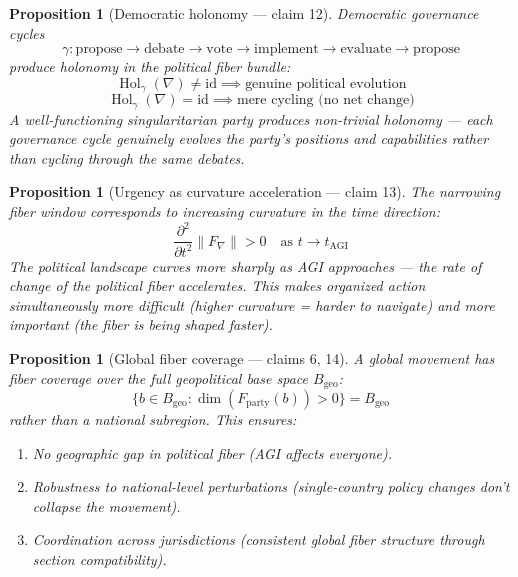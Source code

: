 \documentclass[11pt,a4paper]{article}
\newtheorem{proposition}[definition]{Proposition}
\begin{document}
\begin{proposition}[Democratic holonomy --- claim 12]
\label{prop:holonomy}
Democratic governance cycles
\[
  \gamma: \text{propose} \to \text{debate} \to \text{vote}
    \to \text{implement} \to \text{evaluate} \to \text{propose}
\]
produce holonomy in the political fiber bundle:
\[
  \operatorname{Hol}_\gamma(\nabla) \neq \mathrm{id}
  \implies \text{genuine political evolution}
\]
\[
  \operatorname{Hol}_\gamma(\nabla) = \mathrm{id}
  \implies \text{mere cycling (no net change)}
\]
A well-functioning singularitarian party produces non-trivial holonomy ---
each governance cycle genuinely evolves the party's positions and
capabilities rather than cycling through the same debates.
\end{proposition}

\begin{proposition}[Urgency as curvature acceleration --- claim 13]
\label{prop:urgency}
The narrowing fiber window corresponds to increasing curvature in the
time direction:
\[
  \frac{\partial^2}{\partial t^2} \|F_\nabla\| > 0
  \quad \text{as } t \to t_{\text{AGI}}
\]
The political landscape curves more sharply as AGI approaches --- the
rate of change of the political fiber accelerates. This makes organized
action simultaneously more difficult (higher curvature = harder to
navigate) and more important (the fiber is being shaped faster).
\end{proposition}

\begin{proposition}[Global fiber coverage --- claims 6, 14]
\label{prop:global}
A global movement has fiber coverage over the full geopolitical base
space $B_{\text{geo}}$:
\[
  \{b \in B_{\text{geo}} : \dim(F_{\text{party}}(b)) > 0\}
  = B_{\text{geo}}
\]
rather than a national subregion. This ensures:
\begin{enumerate}
  \item No geographic gap in political fiber (AGI affects everyone).
  \item Robustness to national-level perturbations (single-country
    policy changes don't collapse the movement).
  \item Coordination across jurisdictions (consistent global fiber
    structure through section compatibility).
\end{enumerate}
\end{proposition}



\end{document}

